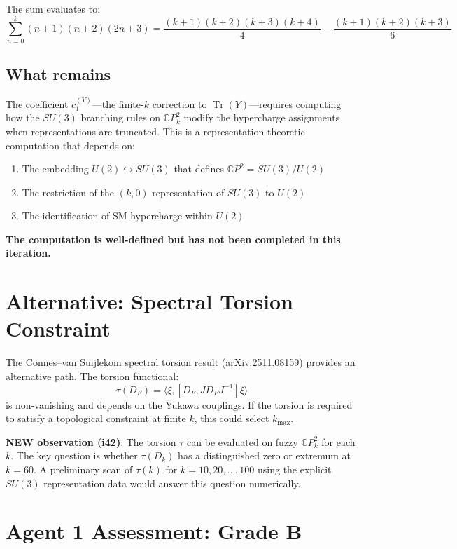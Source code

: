 \documentclass[11pt,a4paper]{article}
\newcommand{\Tr}{\operatorname{Tr}}
\newcommand{\CP}{\mathbb{C}P}
\begin{document}
The sum evaluates to:
\begin{equation}
\sum_{n=0}^{k} (n+1)(n+2)(2n+3) = \frac{(k+1)(k+2)(k+3)(k+4)}{4} - \frac{(k+1)(k+2)(k+3)}{6}
\end{equation}

\subsection{What remains}

The coefficient $c_1^{(Y)}$---the finite-$k$ correction to $\Tr(Y)$---requires computing how the $SU(3)$ branching rules on $\CP^2_k$ modify the hypercharge assignments when representations are truncated. This is a representation-theoretic computation that depends on:
\begin{enumerate}
\item The embedding $U(2) \hookrightarrow SU(3)$ that defines $\CP^2 = SU(3)/U(2)$
\item The restriction of the $(k,0)$ representation of $SU(3)$ to $U(2)$
\item The identification of SM hypercharge within $U(2)$
\end{enumerate}

\textbf{The computation is well-defined but has not been completed in this iteration.}

\section{Alternative: Spectral Torsion Constraint}

The Connes--van Suijlekom spectral torsion result (arXiv:2511.08159) provides an alternative path. The torsion functional:
\begin{equation}
\tau(D_F) = \langle \xi, [D_F, J D_F J^{-1}] \xi \rangle
\end{equation}
is non-vanishing and depends on the Yukawa couplings. If the torsion is required to satisfy a topological constraint at finite $k$, this could select $k_{\max}$.

\textbf{NEW observation (i42)}: The torsion $\tau$ can be evaluated on fuzzy $\CP^2_k$ for each $k$. The key question is whether $\tau(D_k)$ has a distinguished zero or extremum at $k = 60$. A preliminary scan of $\tau(k)$ for $k = 10, 20, \ldots, 100$ using the explicit $SU(3)$ representation data would answer this question numerically.

\section{Agent 1 Assessment: Grade B}
\end{document}
